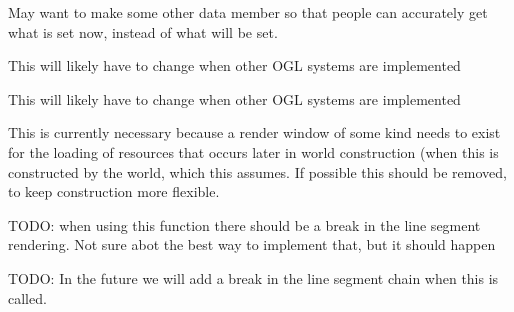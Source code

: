 \begin{DoxyRefList}
\item[\label{todo__todo000034}%
\hypertarget{todo__todo000034}{}%
Member \hyperlink{classMezzanine_1_1GraphicsManager_ac990a8260dc99ba245383076a98026ac}{Mezzanine\-:\-:Graphics\-Manager\-:\-:Apply\-Setting\-Group\-Impl} (Object\-Setting\-Group $\ast$\-Group)]May want to make some other data member so that people can accurately get what is set now, instead of what will be set.  
\item[\label{todo__todo000035}%
\hypertarget{todo__todo000035}{}%
Member \hyperlink{classMezzanine_1_1GraphicsManager_ac551af6ddb5453e93ffb0cbca2441d46}{Mezzanine\-:\-:Graphics\-Manager\-:\-:Get\-Render\-System\-Name} (const Graphics\-::\-Render\-System \&Render\-Sys)]This will likely have to change when other O\-G\-L systems are implemented  
\item[\label{todo__todo000036}%
\hypertarget{todo__todo000036}{}%
Member \hyperlink{classMezzanine_1_1GraphicsManager_a2b1ef2b45f8e23fb28213277e640c709}{Mezzanine\-:\-:Graphics\-Manager\-:\-:Get\-Shortened\-Render\-System\-Name} (const Graphics\-::\-Render\-System \&Render\-Sys)]This will likely have to change when other O\-G\-L systems are implemented  
\item[\label{todo__todo000032}%
\hypertarget{todo__todo000032}{}%
Member \hyperlink{classMezzanine_1_1GraphicsManager_a2593a4d4032c66ee5bf3230fcf590a98}{Mezzanine\-:\-:Graphics\-Manager\-:\-:Graphics\-Manager} (X\-M\-L\-::\-Node \&X\-M\-L\-Node)]This is currently necessary because a render window of some kind needs to exist for the loading of resources that occurs later in world construction (when this is constructed by the world, which this assumes. If possible this should be removed, to keep construction more flexible.  
\item[\label{todo__todo000041}%
\hypertarget{todo__todo000041}{}%
Member \hyperlink{classMezzanine_1_1Internal_1_1Line3D_a65e447dd23d6428bb7c2715e57f4e972}{Mezzanine\-:\-:Internal\-:\-:Line3\-D\-:\-:draw\-Line} (const Vector3 \&start, const Vector3 \&end)]T\-O\-D\-O\-: when using this function there should be a break in the line segment rendering. Not sure abot the best way to implement that, but it should happen  
\item[\label{todo__todo000043}%
\hypertarget{todo__todo000043}{}%
Member \hyperlink{classMezzanine_1_1LineGroup_acadb6f8ccbe70828b094f07a11f276ac}{Mezzanine\-:\-:Line\-Group\-:\-:draw\-Line} (const Vector3 \&start, const Vector3 \&end)]T\-O\-D\-O\-: In the future we will add a break in the line segment chain when this is called.  

\end{DoxyRefList}
